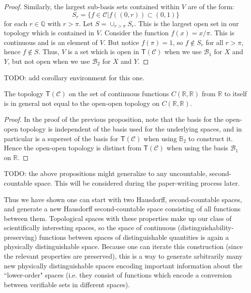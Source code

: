 \documentclass[11pt,letterpaper,fleqn]{memoir} %
\begin{document}
\begin{mathSection}
\begin{proof}
	Similarly, the largest sub-basis sets contained within $V$ are of the form: 
	$$
	S_r = \{f\in\mathcal{C} | f((0,r))\subset(0,1)\}
	$$
	for each $r\in \mathbb{Q}$ with $r>\pi$. Let $S = \cup_{r>\pi}S_r$. This is the largest open set in our topology which is contained in $V$. Consider the function $f(x) = x/\pi$. This is continuous and is an element of $V$. But notice $f(\pi)=1$, so $f\notin S_r$ for all $r>\pi$, hence $f\notin S$. Thus, $V$ is a set which is open in $\mathsf{T}(\mathcal{C})$ when we use $\mathcal{B}_1$ for $X$ and $Y$, but not open when we use $\mathcal{B}_2$ for $X$ and $Y$. 
\end{proof}

TODO: add corollary environment for this one. 

\begin{prop}
The topology $\mathsf{T}(\mathcal{C})$ on the set of continuous functions $C(\mathbb{R},\mathbb{R})$ from $\mathbb{R}$ to itself is in general not equal to the open-open topology on $C(\mathbb{R},\mathbb{R})$.
\end{prop}
\begin{proof}
In the proof of the previous proposition, note that the basis for the open-open topology is independent of the basis used for the underlying spaces, and in particular is a superset of the basis for $\mathsf{T}(\mathcal{C})$ when using $\mathbb{B}_2$ to construct it. Hence the open-open topology is distinct from $\mathsf{T}(\mathcal{C})$ when using the basis $\mathcal{B}_1$ on $\mathbb{R}$. 
\end{proof}

TODO: the above propositions might generalize to any uncountable, second-countable space. This will be considered during the paper-writing process later. 

Thus we have shown one can start with two Hausdorff, second-countable spaces, and generate a new Hausdorff second-countable space consisting of all functions between them. Topological spaces with these properties make up our class of scientifically interesting spaces, so the space of continuous (distinguishability-preserving) functions between spaces of distinguishable quantities is again a physically distinguishable space. Because one can iterate this construction (since the relevant properties are preserved), this is a way to generate arbitrarily many new physically distinguishable spaces encoding important information about the ``lower-order" spaces (i.e. they consist of functions which encode a conversion between verifiable sets in different spaces).

\end{mathSection}
\end{document}
